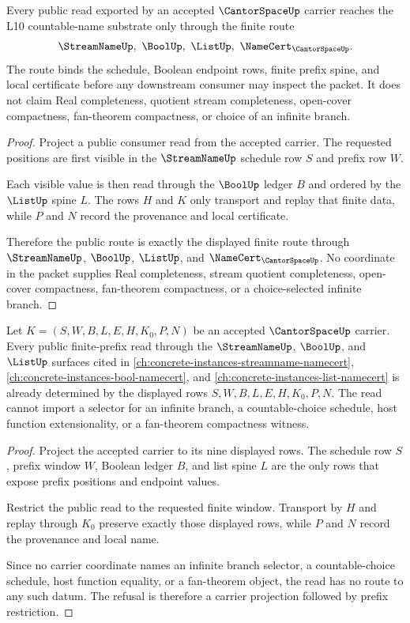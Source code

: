 \begin{theorem}
\label{thm:cantor-space-streamname-bool-scope}
Every public read exported by an accepted $\CantorSpaceUp$ carrier reaches the
L10 countable-name substrate only through the finite route
$$
\StreamNameUp,\ \BoolUp,\ \ListUp,\ \NameCert_{\CantorSpaceUp}.
$$
The route binds the schedule, Boolean endpoint rows, finite prefix spine, and
local certificate before any downstream consumer may inspect the packet. It
does not claim Real completeness, quotient stream completeness, open-cover
compactness, fan-theorem compactness, or choice of an infinite branch.
\end{theorem}
\begin{proof}
Project a public consumer read from the accepted carrier. The requested
positions are first visible in the $\StreamNameUp$ schedule row $S$ and prefix
row $W$.

Each visible value is then read through the $\BoolUp$ ledger $B$ and ordered by
the $\ListUp$ spine $L$. The rows $H$ and $K$ only transport and replay that
finite data, while $P$ and $N$ record the provenance and local certificate.

Therefore the public route is exactly the displayed finite route through
$\StreamNameUp$, $\BoolUp$, $\ListUp$, and
$\NameCert_{\CantorSpaceUp}$. No coordinate in the packet supplies Real
completeness, stream quotient completeness, open-cover compactness,
fan-theorem compactness, or a choice-selected infinite branch.
\end{proof}

\begin{theorem}
\label{thm:cantor-space-choice-refusal}
Let $K=(S,W,B,L,E,H,K_0,P,N)$ be an accepted $\CantorSpaceUp$ carrier. Every
public finite-prefix read through the $\StreamNameUp$, $\BoolUp$, and
$\ListUp$ surfaces cited in
\autoref{ch:concrete-instances-streamname-namecert},
\autoref{ch:concrete-instances-bool-namecert}, and
\autoref{ch:concrete-instances-list-namecert} is already determined by the
displayed rows $S,W,B,L,E,H,K_0,P,N$. The read cannot import a selector for an
infinite branch, a countable-choice schedule, host function extensionality, or
a fan-theorem compactness witness.
\end{theorem}
\begin{proof}
Project the accepted carrier to its nine displayed rows. The schedule row $S$,
prefix window $W$, Boolean ledger $B$, and list spine $L$ are the only rows
that expose prefix positions and endpoint values.

Restrict the public read to the requested finite window. Transport by $H$ and
replay through $K_0$ preserve exactly those displayed rows, while $P$ and $N$
record the provenance and local name.

Since no carrier coordinate names an infinite branch selector, a
countable-choice schedule, host function equality, or a fan-theorem object, the
read has no route to any such datum. The refusal is therefore a carrier
projection followed by prefix restriction.
\end{proof}

